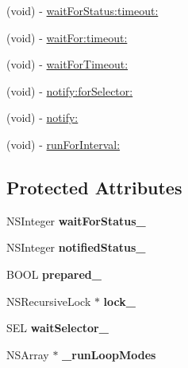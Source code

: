 \begin{DoxyCompactItemize}
\item 
(void) -\/ \hyperlink{interface_g_h_async_test_case_ae8781529003ebef3a06569c0157687ae}{wait\-For\-Status\-:timeout\-:}
\item 
(void) -\/ \hyperlink{interface_g_h_async_test_case_a43422127c8303a93f0ae39c883a2da06}{wait\-For\-:timeout\-:}
\item 
(void) -\/ \hyperlink{interface_g_h_async_test_case_aaf22dd45b3493e110362392cc3dc086b}{wait\-For\-Timeout\-:}
\item 
(void) -\/ \hyperlink{interface_g_h_async_test_case_ab1be43eb4f4909ce5607b51fa0a1f40b}{notify\-:for\-Selector\-:}
\item 
(void) -\/ \hyperlink{interface_g_h_async_test_case_ad21d6cdd1f2a284ee7b5ad5b6d1c82e2}{notify\-:}
\item 
(void) -\/ \hyperlink{interface_g_h_async_test_case_accbc972d3d516d1e53529c84fa2fc510}{run\-For\-Interval\-:}
\end{DoxyCompactItemize}
\subsection*{\-Protected \-Attributes}
\begin{DoxyCompactItemize}
\item 
\hypertarget{interface_g_h_async_test_case_af3c346a2646dc8ea12fafd337c09c441}{
\-N\-S\-Integer {\bfseries wait\-For\-Status\-\_\-}}
\label{interface_g_h_async_test_case_af3c346a2646dc8ea12fafd337c09c441}

\item 
\hypertarget{interface_g_h_async_test_case_ad078e9d72cd6c1813c11e32606d72b83}{
\-N\-S\-Integer {\bfseries notified\-Status\-\_\-}}
\label{interface_g_h_async_test_case_ad078e9d72cd6c1813c11e32606d72b83}

\item 
\hypertarget{interface_g_h_async_test_case_a9775e3124d455f7d72096f4683485449}{
\-B\-O\-O\-L {\bfseries prepared\-\_\-}}
\label{interface_g_h_async_test_case_a9775e3124d455f7d72096f4683485449}

\item 
\hypertarget{interface_g_h_async_test_case_a039f149c5176be118fb83c05ee077f91}{
\-N\-S\-Recursive\-Lock $\ast$ {\bfseries lock\-\_\-}}
\label{interface_g_h_async_test_case_a039f149c5176be118fb83c05ee077f91}

\item 
\hypertarget{interface_g_h_async_test_case_aefdbcca14d4d689336fdb0ff80b085f7}{
\-S\-E\-L {\bfseries wait\-Selector\-\_\-}}
\label{interface_g_h_async_test_case_aefdbcca14d4d689336fdb0ff80b085f7}

\item 
\hypertarget{interface_g_h_async_test_case_a2a795d674d1dadc289e4546976fa8718}{
\-N\-S\-Array $\ast$ {\bfseries \-\_\-run\-Loop\-Modes}}
\label{interface_g_h_async_test_case_a2a795d674d1dadc289e4546976fa8718}

\end{DoxyCompactItemize}
